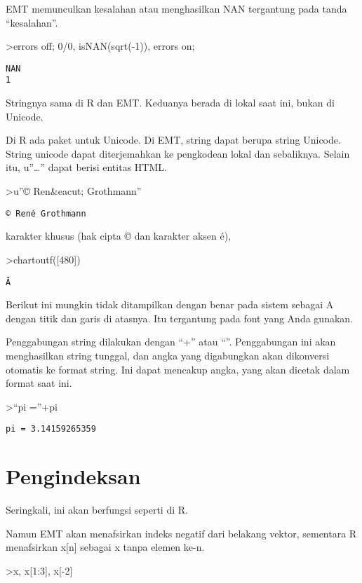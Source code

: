 \documentclass[
]{book}
\begin{document}
EMT memunculkan kesalahan atau menghasilkan NAN tergantung pada tanda ``kesalahan''.

\textgreater errors off; 0/0, isNAN(sqrt(-1)), errors on;

\begin{verbatim}
NAN
1
\end{verbatim}

Stringnya sama di R dan EMT. Keduanya berada di lokal saat ini, bukan di Unicode.

Di R ada paket untuk Unicode. Di EMT, string dapat berupa string Unicode. String unicode dapat diterjemahkan ke pengkodean lokal dan sebaliknya. Selain itu, u''\ldots'' dapat berisi entitas HTML.

\textgreater u''© Ren\&eacut; Grothmann''

\begin{verbatim}
© René Grothmann
\end{verbatim}

karakter khusus (hak cipta © dan karakter aksen é),

\textgreater chartoutf({[}480{]})

\begin{verbatim}
Ǡ
\end{verbatim}

Berikut ini mungkin tidak ditampilkan dengan benar pada sistem sebagai A dengan titik dan garis di atasnya. Itu tergantung pada font yang Anda gunakan.

Penggabungan string dilakukan dengan ``+'' atau ``\textbar{}''. Penggabungan ini akan menghasilkan string tunggal, dan angka yang digabungkan akan dikonversi otomatis ke format string. Ini dapat mencakup angka, yang akan dicetak dalam format saat ini.

\textgreater{}``pi =''+pi

\begin{verbatim}
pi = 3.14159265359
\end{verbatim}

\chapter{Pengindeksan}\label{pengindeksan}

Seringkali, ini akan berfungsi seperti di R.

Namun EMT akan menafsirkan indeks negatif dari belakang vektor, sementara R menafsirkan x{[}n{]} sebagai x tanpa elemen ke-n.

\textgreater x, x{[}1:3{]}, x{[}-2{]}
\end{document}
